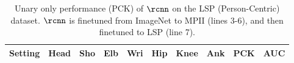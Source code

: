 \tabcolsep 1.5pt
\begin{table}[tbp]
 \scriptsize
  \centering
  \begin{tabular}{@{} l c ccc cc cc|c@{}}
    \toprule
    Setting& Head   & Sho  & Elb & Wri & Hip & Knee & Ank & PCK & AUC\\
    \midrule
    
    \midrule
    
    \midrule    
    
    
    
    \midrule
     
    
    \bottomrule \end{tabular} 
\vspace{0.3em} 
    \caption[]{Unary only performance (PCK) of $\rcnn$ on the LSP
    (Person-Centric) dataset. $\rcnn$ is finetuned from ImageNet to
    MPII (lines 3-6), and then finetuned to LSP (line 7).}
\vspace{-1.0em} 
\label{tab:unary:rcnn}
\end{table}
